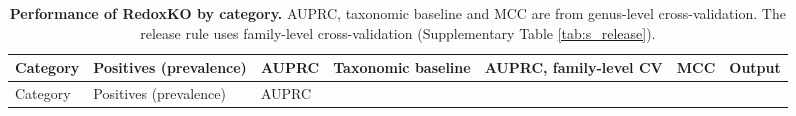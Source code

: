 \documentclass[10pt,a4paper,onecolumn]{article}
\begin{document}
\begin{longtable}[]{@{}
  >{\raggedright\arraybackslash}p{}
  >{\raggedright\arraybackslash}p{}
  >{\raggedleft\arraybackslash}p{}
  >{\raggedleft\arraybackslash}p{}
  >{\raggedleft\arraybackslash}p{}
  >{\raggedleft\arraybackslash}p{}
  >{\raggedright\arraybackslash}p{}@{}}
\caption{\textbf{Performance of RedoxKO by category.} AUPRC, taxonomic
baseline and MCC are from genus-level cross-validation. The release rule
uses family-level cross-validation (Supplementary Table
\ref{tab:s_release}). \label{tab:pertrait}}\tabularnewline
\toprule\noalign{}
\begin{minipage}[b]{\linewidth}\raggedright
Category
\end{minipage} & \begin{minipage}[b]{\linewidth}\raggedright
Positives (prevalence)
\end{minipage} & \begin{minipage}[b]{\linewidth}\raggedleft
AUPRC
\end{minipage} & \begin{minipage}[b]{\linewidth}\raggedleft
Taxonomic baseline
\end{minipage} & \begin{minipage}[b]{\linewidth}\raggedleft
AUPRC, family-level CV
\end{minipage} & \begin{minipage}[b]{\linewidth}\raggedleft
MCC
\end{minipage} & \begin{minipage}[b]{\linewidth}\raggedright
Output
\end{minipage} \\
\midrule\noalign{}
\endfirsthead
\toprule\noalign{}
\begin{minipage}[b]{\linewidth}\raggedright
Category
\end{minipage} & \begin{minipage}[b]{\linewidth}\raggedright
Positives (prevalence)
\end{minipage} & \begin{minipage}[b]{\linewidth}\raggedleft
AUPRC
\end{minipage} & \begin{minipage}[b]{\linewidth}\raggedleft

\end{minipage}
\end{longtable}
\end{document}
